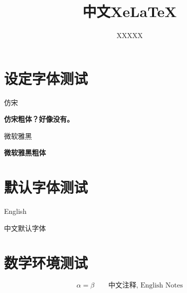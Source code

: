 \documentclass[12pt,a4paper]{article}
\begin{document}
\title{\Huge\yahei 中文XeLaTeX}


\author{XXXXX}


\newcommand{\dd}{\mathrm d}
\newenvironment{eqnset}
{\begin{equation}\left \bracevert \begin{array}{l}}
{\end{array} \right. \end{equation}}

\newenvironment{eqn}
{\begin{equation}\left \bracevert \begin{array}{l}}
{\end{array} \right. \end{equation}}



\section{设定字体测试}
\fs 仿宋

\textbf{\fs 仿宋粗体？好像没有。}

\yahei 微软雅黑

\textbf{\yahei 微软雅黑粗体}


\section{默认字体测试}

English

中文默认字体

\section{数学环境测试}

\begin{equation}
\alpha=\beta \qquad \text{中文注释, English Notes}
\end{equation}
\end{document}
